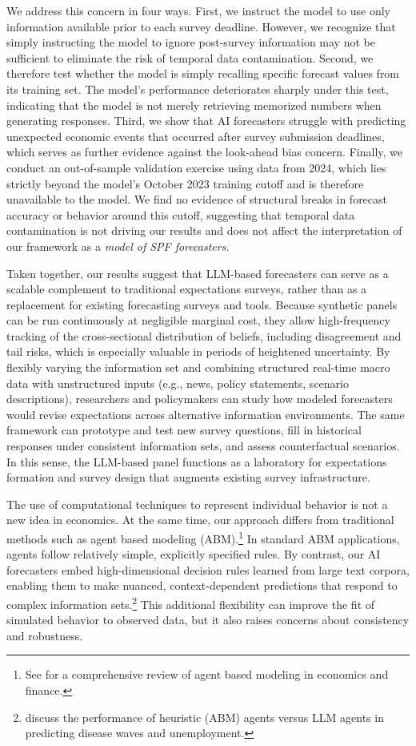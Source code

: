 \documentclass[11pt,letterpaper]{scrartcl}
\begin{document}
We address this concern in four ways. First, we instruct the model to use only information available prior to each survey deadline. However, we recognize that simply instructing the model to ignore post-survey information may not be sufficient to eliminate the risk of temporal data contamination. Second, we therefore test whether the model is simply recalling specific forecast values from its training set. The model's performance deteriorates sharply under this test, indicating that the model is not merely retrieving memorized numbers when generating responses. Third, we show that AI forecasters struggle with predicting unexpected economic events that occurred after survey submission deadlines, which serves as further evidence against the look-ahead bias concern. Finally, we conduct an out-of-sample validation exercise using data from 2024, which lies strictly beyond the model's October 2023 training cutoff and is therefore unavailable to the model. We find no evidence of structural breaks in forecast accuracy or behavior around this cutoff, suggesting that temporal data contamination is not driving our results and does not affect the interpretation of our framework as a \emph{model of SPF forecasters}. 

Taken together, our results suggest that LLM-based forecasters can serve as a scalable complement to traditional expectations surveys, rather than as a replacement for existing forecasting surveys and tools. Because synthetic panels can be run continuously at negligible marginal cost, they allow high-frequency tracking of the cross-sectional distribution of beliefs, including disagreement and tail risks, which is especially valuable in periods of heightened uncertainty. By flexibly varying the information set and combining structured real-time macro data with unstructured inputs (e.g., news, policy statements, scenario descriptions), researchers and policymakers can study how modeled forecasters would revise expectations across alternative information environments. The same framework can prototype and test new survey questions, fill in historical responses under consistent information sets, and assess counterfactual scenarios. In this sense, the LLM-based panel functions as a laboratory for expectations formation and survey design that augments existing survey infrastructure.

The use of computational techniques to represent individual behavior is not a new idea in economics. At the same time, our approach differs from traditional methods such as agent based modeling (ABM).\footnote{See \cite{axtell2022agent} for a comprehensive review of agent based modeling in economics and finance.} In standard ABM applications, agents follow relatively simple, explicitly specified rules. By contrast, our AI forecasters embed high-dimensional decision rules learned from large text corpora, enabling them to make nuanced, context-dependent predictions that respond to complex information sets.\footnote{\citet{chopra2024limits} discuss the performance of heuristic (ABM) agents versus LLM agents in predicting disease waves and unemployment.} This additional flexibility can improve the fit of simulated behavior to observed data, but it also raises concerns about consistency and robustness.
\end{document}
